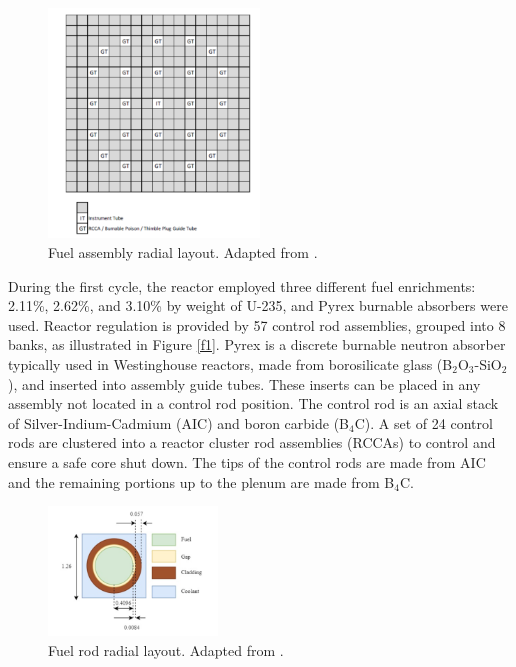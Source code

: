 \begin{figure}
    \centering
    \includegraphics[width=0.5\textwidth]{figs/asm.png}
    \caption[Fuel assembly radial layout.]{Fuel assembly radial layout. Adapted from \cite{albagami}.}
    \label{f3}
\end{figure}

During the first cycle, the reactor employed three different fuel enrichments: 2.11\%, 2.62\%, and 3.10\% by weight of U-235, and Pyrex burnable absorbers were used. Reactor regulation is provided by 57 control rod assemblies, grouped into 8 banks, as illustrated in Figure \ref{f1}. Pyrex is a discrete burnable neutron absorber typically used in Westinghouse reactors, made from borosilicate glass (B$_2$O$_3$-SiO$_2$), and inserted into assembly guide tubes. These inserts can be placed in any assembly not located in a control rod position. The control rod is an axial stack of Silver-Indium-Cadmium (AIC) and boron carbide (B$_4$C). A set of 24 control rods are clustered into a reactor cluster rod assemblies (RCCAs) to control and ensure a safe core shut down. The tips of the control rods are made from AIC and the remaining portions up to the plenum are made from B$_4$C. 

\begin{figure}
    \centering
    \includegraphics[width=0.4\textwidth]{figs/pin.png}
    \caption[Fuel rod radial layout.]{Fuel rod radial layout. Adapted from \cite{albagami}.}
    \label{f2}
\end{figure}

